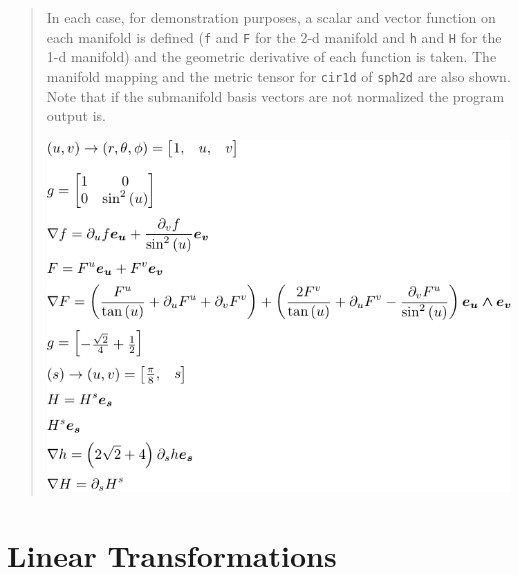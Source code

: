 \documentclass[12pt,twoside,openright]{memoir}
\newcommand{\T}[1]{\texttt{#1}}
\begin{document}
\begin{quote}
	In each case, for demonstration purposes, a scalar and vector function on each manifold is defined (\T{f} and \T{F}
	for the 2-d manifold and \T{h} and \T{H} for the 1-d manifold) and the geometric derivative of each function is taken.  The 
	manifold mapping and the metric tensor for \T{cir1d} of \T{sph2d} are also shown. Note that if the submanifold basis vectors
	are not normalized the program output is.
	\begin{center}
	\includegraphics[scale=1]{python/submanifold1.pdf}	
	\end{center} 		
\end{quote}

\section{Linear Transformations}
\end{document}
